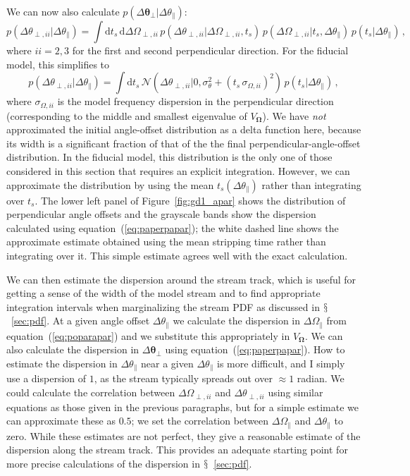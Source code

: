 \documentclass[12pt,preprint]{aastex}
\newcommand{\dd}{\mathrm{d}}
\newcommand{\eqnname}{equation}
\newcommand{\equationname}{\eqnname}
\renewcommand{\figurename}{Figure}
\newcommand{\sectionname}{$\mathsection$}
\renewcommand{\vec}[1]{\ensuremath{\mathbf{#1}}}
\newcommand{\veco}{\ensuremath{\vec{\Omega}}}
\newcommand{\veca}{\ensuremath{\boldsymbol\theta}}
\newcommand{\apar}{\ensuremath{\theta_\parallel}}
\newcommand{\opar}{\ensuremath{\Omega_\parallel}}
\newcommand{\aperp}{\ensuremath{\veca_\perp}}
\newcommand{\aperpii}{\ensuremath{\theta_{\perp,ii}}}
\newcommand{\operpii}{\ensuremath{\Omega_{\perp,ii}}}
\newcommand{\ts}{\ensuremath{t_s}}
\begin{document}
We can now also calculate $p(\Delta \aperp|\Delta \apar)$:
\begin{equation}
  p(\Delta \aperpii|\Delta \apar) = \int \dd \ts \,\dd \Delta
  \operpii \,p(\Delta \aperpii|\Delta \operpii,\ts)\,p(\Delta \operpii|\ts,\Delta \apar)\,p(\ts|\Delta \apar)\,,
\end{equation}
where $ii=2,3$ for the first and second perpendicular direction. For
the fiducial model, this simplifies to
\begin{equation}\label{eq:paperpapar}
  p(\Delta \aperpii|\Delta \apar) = \int \dd \ts \,\mathcal{N}\left(\Delta \aperpii|0,\sigma_{\theta}^2+(\ts\,\sigma_{\Omega,ii})^2\right)\,p(\ts|\Delta \apar)\,,
\end{equation}
where $\sigma_{\Omega,ii}$ is the model frequency dispersion in the
perpendicular direction (corresponding to the middle and smallest
eigenvalue of $V_\veco$). We have \emph{not} approximated the initial
angle-offset distribution as a delta function here, because its width
is a significant fraction of that of the the final
perpendicular-angle-offset distribution. In the fiducial model, this
distribution is the only one of those considered in this section that
requires an explicit integration. However, we can approximate the
distribution by using the mean $\ts(\Delta \apar)$ rather than
integrating over $\ts$. The lower left panel of
\figurename~\ref{fig:gd1_apar} shows the distribution of perpendicular
angle offsets and the grayscale bands show the dispersion calculated
using \equationname~(\ref{eq:paperpapar}); the white dashed line shows
the approximate estimate obtained using the mean stripping time rather
than integrating over it. This simple estimate agrees well with the
exact calculation.

We can then estimate the dispersion around the stream track, which is
useful for getting a sense of the width of the model stream and to
find appropriate integration intervals when marginalizing the stream
PDF as discussed in \sectionname~\ref{sec:pdf}. At a given angle
offset $\Delta \apar$ we calculate the dispersion in $\Delta \opar$
from \equationname~(\ref{eq:poparapar}) and we substitute this
appropriately in $V_\veco$. We can also calculate the dispersion in
$\Delta \aperp$ using \equationname~(\ref{eq:paperpapar}). How to
estimate the dispersion in $\Delta \apar$ near a given $\Delta \apar$
is more difficult, and I simply use a dispersion of $1$, as the stream
typically spreads out over $\approx 1$ radian. We could calculate the
correlation between $\Delta \operpii$ and $\Delta \aperpii$ using
similar equations as those given in the previous paragraphs, but for a
simple estimate we can approximate these as $0.5$; we set the
correlation between $\Delta \opar$ and $\Delta \apar$ to zero. While
these estimates are not perfect, they give a reasonable estimate of
the dispersion along the stream track. This provides an adequate
starting point for more precise calculations of the dispersion in
\sectionname~\ref{sec:pdf}.
\end{document}
